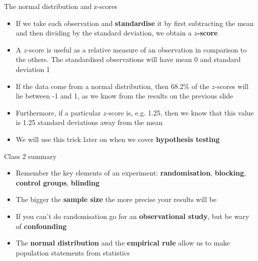 \documentclass[12pt,xcolor=dvipsnames,handout,mathserif,aspectratio=169]{beamer}
\newcommand{\bbl}[1]{{\color{NavyBlue} \textbf{#1}}}
\newcommand{\bre}[1]{{\color{red} \textbf{#1}}}
\newcommand{\bgr}[1]{{\color{PineGreen} \textbf{#1}}}
\begin{document}
\begin{frame}{ The normal distribution and z-scores }
\begin{itemize}
\item If we take each observation and \bgr{standardise} it by first subtracting the mean and then dividing by the standard deviation, we obtain a \bbl{$z$-score}
\pause
\item A $z$-score is useful as a relative measure of an observation in comparison to the others. The standardised observations will have mean 0 and standard deviation 1
\pause
\item If the data come from a normal distribution, then 68.2\% of the $z$-scores will lie between -1 and 1, as we know from the results on the previous slide
\pause
\item Furthermore, if a particular $z$-score is, e.g. 1.25, then we know that this value is 1.25 standard deviations away from the mean
\pause
\item We will use this trick later on when we cover \bre{hypothesis testing}
\end{itemize}
\end{frame}

\begin{frame}{Class 2 summary}
\begin{itemize}
\item Remember the key elements of an experiment: \bbl{randomisation}, \bbl{blocking}, \bbl{control groups}, \bbl{blinding}
\item The bigger the \bgr{sample size} the more precise your results will be 
\item If you can't do randomisation go for an \bbl{observational study}, but be wary of \bre{confounding}
\item The \bbl{normal distribution} and the \bgr{empirical rule} allow us to make population statements from statistics

\end{itemize}
\end{frame}
\end{document}
